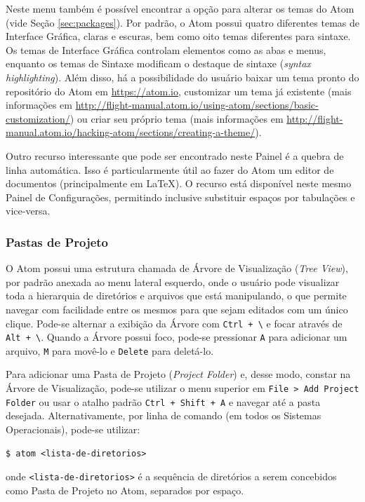 	Neste menu também é possível encontrar a opção para alterar os temas do Atom (vide Seção \ref{sec:packages}). Por padrão, o Atom possui quatro diferentes temas de Interface Gráfica, claras e escuras, bem como oito temas diferentes para sintaxe. Os temas de Interface Gráfica controlam elementos como as abas e menus, enquanto os temas de Sintaxe modificam o destaque de sintaxe (\textit{syntax highlighting}). Além disso, há a possibilidade do usuário baixar um tema pronto do repositório do Atom em \href{https://atom.io}{https://atom.io}, customizar um tema já existente (mais informações em \href{http://flight-manual.atom.io/using-atom/sections/basic-customization/}{http://flight-manual.atom.io/using-atom/sections/basic-customization/}) ou criar seu próprio tema (mais informações em \href{http://flight-manual.atom.io/hacking-atom/sections/creating-a-theme/}{http://flight-manual.atom.io/hacking-atom/sections/creating-a-theme/}).

	Outro recurso interessante que pode ser encontrado neste Painel é a quebra de linha automática. Isso é particularmente útil ao fazer do Atom um editor de documentos (principalmente em \LaTeX). O recurso está disponível neste mesmo Painel de Configurações, permitindo inclusive substituir espaços por tabulações e vice-versa.

	\subsubsection{Pastas de Projeto}
	O Atom possui uma estrutura chamada de Árvore de Visualização (\textit{Tree View}), por padrão anexada ao menu lateral esquerdo, onde o usuário pode visualizar toda a hierarquia de diretórios e arquivos que está manipulando, o que permite navegar com facilidade entre os mesmos para que sejam editados com um único clique. Pode-se alternar a exibição da Árvore com \verb|Ctrl + \| e focar através de \verb|Alt + \|. Quando a Árvore possui foco, pode-se pressionar \verb|A| para adicionar um arquivo, \verb|M| para movê-lo e \verb|Delete| para deletá-lo.

	Para adicionar uma Pasta de Projeto (\textit{Project Folder}) e, desse modo, constar na Árvore de Visualização, pode-se utilizar o menu superior em \verb|File > Add Project Folder| ou usar o atalho padrão \verb|Ctrl + Shift + A| e navegar até a pasta desejada. Alternativamente, por linha de comando (em todos os Sistemas Operacionais), pode-se utilizar:
	\begin{Verbatim}[fontsize=\footnotesize]
$ atom <lista-de-diretorios>
	\end{Verbatim}
	onde \verb|<lista-de-diretorios>| é a sequência de diretórios a serem concebidos como Pasta de Projeto no Atom, separados por espaço.

